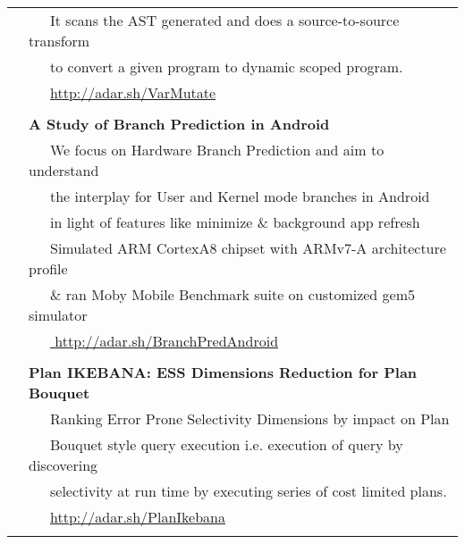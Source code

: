 \documentclass[a4paper,10pt]{article} %
\begin{document}
\begin{tabular}{rl}
& ~~~It scans the AST generated and does a source-to-source transform\\
& ~~~to convert a given program to dynamic scoped program.\\
& ~~~\href{http://adar.sh/VarMutate}{http://adar.sh/VarMutate} \\
& \\
& \textbf{A Study of Branch Prediction in Android} \\
& ~~~We focus on Hardware Branch Prediction and aim to understand\\
& ~~~the interplay for User and Kernel mode branches in Android\\
& ~~~in light of features like minimize \& background app refresh\\
& ~~~Simulated ARM CortexA8 chipset with ARMv7-A architecture profile\\
& ~~~\& ran Moby Mobile Benchmark suite on customized gem5 simulator\\
& ~~~\href{http://adar.sh/BranchPredAndroid}{ http://adar.sh/BranchPredAndroid} \\
&\\
& \textbf{Plan IKEBANA: ESS Dimensions Reduction for Plan Bouquet} \\
& ~~~Ranking Error Prone Selectivity Dimensions by impact on Plan\\
& ~~~Bouquet style query execution i.e. execution of query by discovering \\
& ~~~selectivity at run time by executing series of cost limited plans.\\
& ~~~\href{http://adar.sh/PlanIkebana}{http://adar.sh/PlanIkebana}\\
& \\

\end{tabular}
\end{document}
